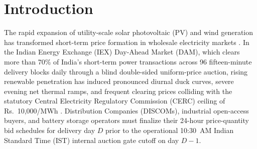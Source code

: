 \documentclass[journal,10pt,twocolumn]{IEEEtran}
\begin{document}
\section{Introduction}
The rapid expansion of utility-scale solar photovoltaic (PV) and wind generation has transformed short-term price formation in wholesale electricity markets \cite{weron2014electricity,lago2021forecasting}. In the Indian Energy Exchange (IEX) Day-Ahead Market (DAM), which clears more than 70\% of India's short-term power transactions across 96 fifteen-minute delivery blocks daily through a blind double-sided uniform-price auction, rising renewable penetration has induced pronounced diurnal duck curves, severe evening net thermal ramps, and frequent clearing prices colliding with the statutory Central Electricity Regulatory Commission (CERC) ceiling of Rs.~10,000/MWh \cite{cerc2023order,iex2024market}. Distribution Companies (DISCOMs), industrial open-access buyers, and battery storage operators must finalize their 24-hour price-quantity bid schedules for delivery day $D$ prior to the operational 10:30~AM Indian Standard Time (IST) internal auction gate cutoff on day $D-1$.
\end{document}
